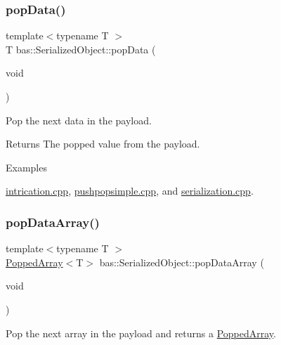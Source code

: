 \subsubsection{\texorpdfstring{popData()}{popData()}}
{\footnotesize\ttfamily template$<$typename T $>$ \\
T bas\+::\+Serialized\+Object\+::pop\+Data (\begin{DoxyParamCaption}\item[{void}]{ }\end{DoxyParamCaption})\hspace{0.3cm}{\ttfamily [inline]}}



Pop the next data in the payload. 

\begin{DoxyReturn}{Returns}
The popped value from the payload. 
\end{DoxyReturn}
\begin{Desc}
\item[Examples]\par
\mbox{\hyperlink{intrication_8cpp-example}{intrication.\+cpp}}, \mbox{\hyperlink{pushpopsimple_8cpp-example}{pushpopsimple.\+cpp}}, and \mbox{\hyperlink{serialization_8cpp-example}{serialization.\+cpp}}.\end{Desc}
\mbox{\label{classbas_1_1SerializedObject_a700a5ad3f53a5e12e51321f29e79e422}} 
\subsubsection{\texorpdfstring{popDataArray()}{popDataArray()}}
{\footnotesize\ttfamily template$<$typename T $>$ \\
\mbox{\hyperlink{classbas_1_1PoppedArray}{Popped\+Array}}$<$T$>$ bas\+::\+Serialized\+Object\+::pop\+Data\+Array (\begin{DoxyParamCaption}\item[{void}]{ }\end{DoxyParamCaption})\hspace{0.3cm}{\ttfamily [inline]}}



Pop the next array in the payload and returns a \mbox{\hyperlink{classbas_1_1PoppedArray}{Popped\+Array}}. 

